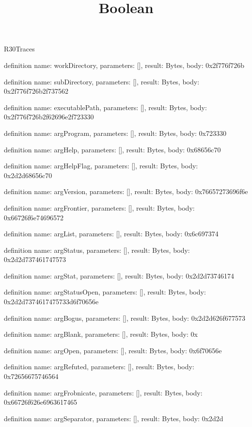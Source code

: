 \begin{lexlean}{R30Traces}
\title{Boolean}
\begin{semanticmodule}
definition{
  name: workDirectory,
  parameters: [],
  result: Bytes,
  body: 0x2f776f726b
}

definition{
  name: subDirectory,
  parameters: [],
  result: Bytes,
  body: 0x2f776f726b2f737562
}

definition{
  name: executablePath,
  parameters: [],
  result: Bytes,
  body: 0x2f776f726b2f62696e2f723330
}

definition{
  name: argProgram,
  parameters: [],
  result: Bytes,
  body: 0x723330
}

definition{
  name: argHelp,
  parameters: [],
  result: Bytes,
  body: 0x68656c70
}

definition{
  name: argHelpFlag,
  parameters: [],
  result: Bytes,
  body: 0x2d2d68656c70
}

definition{
  name: argVersion,
  parameters: [],
  result: Bytes,
  body: 0x76657273696f6e
}

definition{
  name: argFrontier,
  parameters: [],
  result: Bytes,
  body: 0x66726f6e74696572
}

definition{
  name: argList,
  parameters: [],
  result: Bytes,
  body: 0x6c697374
}

definition{
  name: argStatus,
  parameters: [],
  result: Bytes,
  body: 0x2d2d737461747573
}

definition{
  name: argStat,
  parameters: [],
  result: Bytes,
  body: 0x2d2d73746174
}

definition{
  name: argStatusOpen,
  parameters: [],
  result: Bytes,
  body: 0x2d2d7374617475733d6f70656e
}

definition{
  name: argBogus,
  parameters: [],
  result: Bytes,
  body: 0x2d2d626f677573
}

definition{
  name: argBlank,
  parameters: [],
  result: Bytes,
  body: 0x
}

definition{
  name: argOpen,
  parameters: [],
  result: Bytes,
  body: 0x6f70656e
}

definition{
  name: argRefuted,
  parameters: [],
  result: Bytes,
  body: 0x72656675746564
}

definition{
  name: argFrobnicate,
  parameters: [],
  result: Bytes,
  body: 0x66726f626e6963617465
}

definition{
  name: argSeparator,
  parameters: [],
  result: Bytes,
  body: 0x2d2d
}


\end{semanticmodule}
\end{lexlean}

